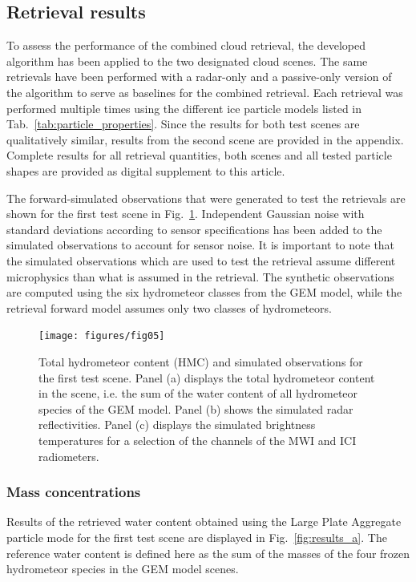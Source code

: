 \documentclass[journal abbreviation, manuscript]{copernicus}
\begin{document}
\subsection{Retrieval results}

To assess the performance of the combined cloud retrieval, the developed
algorithm has been applied to the two designated cloud scenes. The same
retrievals have been performed with a radar-only and a passive-only version of
the algorithm to serve as baselines for the combined retrieval. Each retrieval
was performed multiple times using the different ice particle models listed in
Tab.~\ref{tab:particle_properties}. Since the results for both test scenes are
qualitatively similar, results from the second scene are provided in the
appendix. Complete results for all retrieval quantities, both scenes and all
tested particle shapes are provided as digital supplement to this article.

The forward-simulated observations that were generated to test the retrievals
are shown for the first test scene in Fig.~\ref{fig:observations_a}. Independent
Gaussian noise with standard deviations according to sensor specifications has
been added to the simulated observations to account for sensor noise. It is
important to note that the simulated observations which are used to test the
retrieval assume different microphysics than what is assumed in the retrieval.
The synthetic observations are computed using the six hydrometeor classes from
the GEM model, while the retrieval forward model assumes only two classes of
hydrometeors.

\begin{figure}
\centering \texttt{[image: figures/fig05]}
\caption{Total hydrometeor content (HMC) and simulated observations for the
  first test scene. Panel (a) displays the total hydrometeor content in the
  scene, i.e. the sum of the water content of all hydrometeor species of the GEM
  model. Panel (b) shows the simulated radar reflectivities. Panel (c) displays
  the simulated brightness temperatures for a selection of the channels of the
  MWI and ICI radiometers.}
\label{fig:observations_a}
\end{figure}

\subsubsection{Mass concentrations}

Results of the retrieved water content obtained using the Large Plate Aggregate
particle mode for the first test scene are displayed in
Fig.~\ref{fig:results_a}. The reference water content is defined here as the sum
of the masses of the four frozen hydrometeor species in the GEM model scenes.
\end{document}
